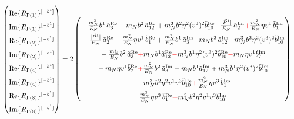 \begin{align}
    \begin{pmatrix}
        \rule{0pt}{16pt} \text{Re}\{ R_{\Gamma(1)}\}^{[-b^1]} \\
        \rule{0pt}{16pt} \text{Im}\{ R_{\Gamma(1)}\}^{[-b^1]} \\
        \rule{0pt}{16pt} \text{Re}\{ R_{\Gamma(2)}\}^{[-b^1]} \\
        \rule{0pt}{16pt} \text{Im}\{ R_{\Gamma(2)}\}^{[-b^1]} \\
        \rule{0pt}{16pt} \text{Re}\{ R_{\Gamma(4)}\}^{[-b^1]} \\
        \rule{0pt}{16pt} \text{Im}\{ R_{\Gamma(4)}\}^{[-b^1]} \\
        \rule{0pt}{16pt} \text{Re}\{ R_{\Gamma(8)}\}^{[-b^1]} \\
        \rule{0pt}{16pt} \text{Im}\{ R_{\Gamma(8)}\}^{[-b^1]}
    \end{pmatrix} &= 2\begin{pmatrix}
     \rule{0pt}{16pt}   \textcolor{red}{-}\frac{\mN^2}{E_N} \bvec^1\, \tilde a^{\text{Re}}_3-  \mN  \bvec^2 \, \tilde a^{\text{Re}}_{12}+  \mN^3  \bvec^2 \eta^2 (v^3)^2 \tilde b^{\text{Re}}_{10} \textcolor{red}{-}\frac{|\vec{P}^1|}{E_N}\, \tilde a^{\text{Im}}_2\textcolor{red}{+} \frac{\mN^2}{E_N} \eta v^1\, \tilde b^{\text{Im}}_1\\
      \rule{0pt}{16pt}  -\frac{|\vec{P}^1|}{E_N}\, \tilde a^{\text{Re}}_2+ \frac{\mN^2}{E_N} \eta v^1\, \tilde b^{\text{Re}}_1 + \frac{\mN^2}{E_N} \bvec^1\, \tilde a^{\text{Im}}_3\textcolor{red}{+} \mN  \bvec^2 \, \tilde a^{\text{Im}}_{12}\textcolor{red}{-} \mN^3  \bvec^2 \eta^2 (v^3)^2 \tilde b^{\text{Im}}_{10}\\
      \rule{0pt}{16pt}  - \frac{\mN^2}{E_N} \bvec^2\, \tilde a^{\text{Re}}_3
		\textcolor{red}{+}  \mN   \bvec^1  \tilde a^{\text{Re}}_{12}\textcolor{red}{-} \mN^3  \bvec^1 \eta^2 (v^3)^2 \tilde b^{\text{Re}}_{10}\textcolor{red}{-}\mN \eta v^1  \tilde b^{\text{Im}}_7 \\
      \rule{0pt}{16pt} - \mN \eta v^1  \tilde b^{\text{Re}}_7 \textcolor{red}{+}  \frac{\mN^2}{E_N} \bvec^2\, \tilde a^{\text{Im}}_3
		- \mN   \bvec^1  \tilde a^{\text{Im}}_{12} +\mN^3  \bvec^1 \eta^2 (v^3)^2 \tilde b^{\text{Im}}_{10}\\
      \rule{0pt}{16pt}-\mN^3 \bvec^2 \eta^2 v^1 v^3\tilde b^{\text{Re}}_{10}\textcolor{red}{+}\frac{\mN^2}{E_N} \eta v^3\, \tilde b^{\text{Im}}_1\\
      \rule{0pt}{16pt} \frac{\mN^2}{E_N} \eta v^3\, \tilde b^{\text{Re}}_1 \textcolor{red}{+} \mN^3 \bvec^2 \eta^2 v^1 v^3\tilde b^{\text{Im}}_{10}\\

\end{pmatrix}
\end{align}
